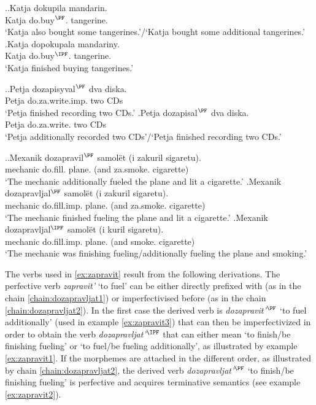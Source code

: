 \ex.\ag.\label{ex:do:kupit}Katja dokupila mandarin.\\
Katja do.buy$^{\PF}$. tangerine.\\
\trans `Katja also bought some tangerines.'/`Katja bought some additional tangerines.'
\bg.\label{ex:do:pokupat}Katja dopokupala mandariny.\\
Katja do.buy$^{\IPF}$. tangerine.\\
\trans `Katja finished buying tangerines.'

\ex.\ag.\label{ex:do:zapisyvat}Petja dozapisyval$^{\PF}$ dva diska.\\
Petja do.za.write.imp. two CDs\\
\trans `Petja finished recording two CDs.'
\bg.\label{ex:do:zapisat}Petja dozapisal$^{\PF}$ dva diska.\\
Petja do.za.write. two CDs\\
\trans `Petja additionally recorded two CDs'/`Petja finished recording two CDs.'

\ex.\label{ex:zapravit}\ag.\label{ex:zapravit3}Mexanik dozapravil$^{\PF}$ samol\"et (i zakuril sigaretu).\\
mechanic do.fill. plane. (and za.smoke. cigarette)\\
\trans `The mechanic additionally fueled the plane and lit a cigarette.'
\bg.\label{ex:zapravit2}Mexanik dozapravljal$^{\PF}$ samol\"et (i zakuril sigaretu).\\
mechanic do.fill.imp. plane. (and za.smoke. cigarette)\\
\trans `The mechanic finished fueling the plane and lit a cigarette.'
\bg.\label{ex:zapravit1}Mexanik dozapravljal$^{\IPF}$ samol\"et (i kuril sigaretu).\\
mechanic do.fill.imp. plane. (and smoke. cigarette)\\
\trans `The mechanic was finishing fueling/additionally fueling the plane and smoking.'

The verbs used in \ref{ex:zapravit} result from the following derivations. The perfective verb \textit{zapravit'} `to fuel' can be either directly prefixed with  (as in the chain \ref{chain:dozapravljat1}) or imperfectivised before (as in the chain \ref{chain:dozapravljat2}). In the first case the derived verb is \textit{dozapravit'}$^{\PF}$ `to fuel additionally' (used in example \ref{ex:zapravit3}) that can then be imperfectivized in order to obtain the verb \textit{dozapravljat'}$^{\IPF}$ that can either mean `to finish/be finishing fueling' or `to fuel/be fueling additionally', as illustrated by example \ref{ex:zapravit1}. If the morphemes are attached in the different order, as illustrated by chain \ref{chain:dozapravljat2}, the derived verb \textit{dozapravljat'}$^{\PF}$ `to finish/be finishing fueling' is perfective and acquires terminative semantics (see example \ref{ex:zapravit2}).

